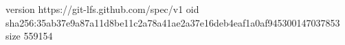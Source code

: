 version https://git-lfs.github.com/spec/v1
oid sha256:35ab37e9a87a11d8be11c2a78a41ae2a37e16deb4eaf1a0af945300147037853
size 559154
